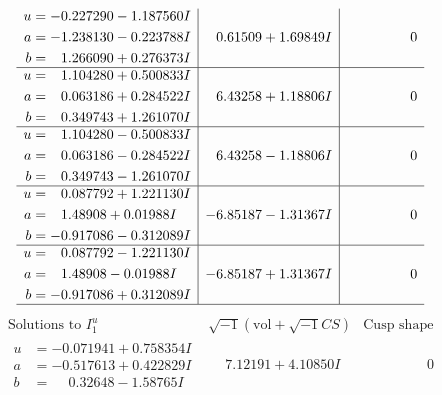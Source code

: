 \documentclass[1p]{elsarticle_modified}
\theoremstyle{definition}
\newcommand{\I}{\sqrt{-1}}
\begin{document}
$$\begin{array}{c|c|c}
\begin{aligned}
u &= -0.227290 - 1.187560 I \\
a &= -1.238130 - 0.223788 I \\
b &= \phantom{-}1.266090 + 0.276373 I\end{aligned}
 & \phantom{-}0.61509 + 1.69849 I & \phantom{-0.000000 } 0 \\ \hline\begin{aligned}
u &= \phantom{-}1.104280 + 0.500833 I \\
a &= \phantom{-}0.063186 + 0.284522 I \\
b &= \phantom{-}0.349743 + 1.261070 I\end{aligned}
 & \phantom{-}6.43258 + 1.18806 I & \phantom{-0.000000 } 0 \\ \hline\begin{aligned}
u &= \phantom{-}1.104280 - 0.500833 I \\
a &= \phantom{-}0.063186 - 0.284522 I \\
b &= \phantom{-}0.349743 - 1.261070 I\end{aligned}
 & \phantom{-}6.43258 - 1.18806 I & \phantom{-0.000000 } 0 \\ \hline\begin{aligned}
u &= \phantom{-}0.087792 + 1.221130 I \\
a &= \phantom{-}1.48908 + 0.01988 I \\
b &= -0.917086 - 0.312089 I\end{aligned}
 & -6.85187 - 1.31367 I & \phantom{-0.000000 } 0 \\ \hline\begin{aligned}
u &= \phantom{-}0.087792 - 1.221130 I \\
a &= \phantom{-}1.48908 - 0.01988 I \\
b &= -0.917086 + 0.312089 I\end{aligned}
 & -6.85187 + 1.31367 I & \phantom{-0.000000 } 0\\
 \hline 
 \end{array}$$\newpage$$\begin{array}{c|c|c}  
\text{Solutions to }I^u_{1}& \I (\text{vol} + \sqrt{-1}CS) & \text{Cusp shape}\\
 \hline 
\begin{aligned}
u &= -0.071941 + 0.758354 I \\
a &= -0.517613 + 0.422829 I \\
b &= \phantom{-}0.32648 - 1.58765 I\end{aligned}
 & \phantom{-}7.12191 + 4.10850 I & \phantom{-0.000000 } 0 \\ \hline\begin{aligned}

\end{aligned}
\end{array}$$
\end{document}
